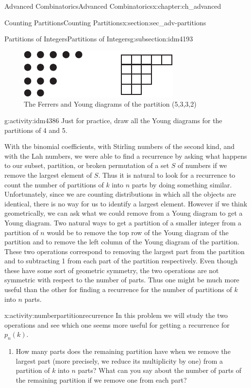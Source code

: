 \documentclass[oneside,10pt,]{book}
\numberwithin{equation}{chapter}
\begin{document}
\begin{chapterptx}{Advanced Combinatorics}{}{Advanced Combinatorics}{}{}{x:chapter:ch_advanced}
\begin{sectionptx}{Counting Partitions}{}{Counting Partitions}{}{}{x:section:sec_adv-partitions}
\begin{subsectionptx}{Partitions of Integers}{}{Partitions of Integers}{}{}{g:subsection:idm4193}
\begin{figure}
\centering
\includegraphics[width=0.45\linewidth]{images/FerrersYoung}
\caption{The Ferrers and Young diagrams of the partition (5,3,3,2)\label{x:figure:FerrersYoung}}
\end{figure}
\begin{activity}{}{g:activity:idm4386}%
Just for practice, draw all the Young diagrams for the partitions of 4 and 5.%
\end{activity}
With the binomial coefficients, with Stirling numbers of the second kind, and with the Lah numbers, we were able to find a recurrence by asking what happens to our subset, partition, or broken permutation of a set \(S\) of numbers if we remove the largest element of \(S\). Thus it is natural to look for a recurrence to count the number of partitions of \(k\) into \(n\) parts by doing something similar. Unfortunately, since we are counting distributions in which all the objects are identical, there is no way for us to identify a largest element. However if we think geometrically, we can ask what we could remove from a Young diagram to get a Young diagram. Two natural ways to get a partition of a smaller integer from a partition of \(n\) would be to remove the top row of the Young diagram of the partition and to remove the left column of the Young diagram of the partition. These two operations correspond to removing the largest part from the partition and to subtracting 1 from each part of the partition respectively. Even though these have some sort of geometric symmetry, the two operations are not symmetric with respect to the number of parts. Thus one might be much more useful than the other for finding a recurrence for the number of partitions of \(k\) into \(n\) parts.%
\begin{activity}{}{x:activity:numberpartitionrecurrence}%
In this problem we will study the two operations and see which one seems more useful for getting a recurrence for \(p_n(k)\).%
\begin{enumerate}[font=\bfseries,label=(\alph*),ref=\alph*]
\item{}How many parts does the remaining partition have when we remove the largest part (more precisely, we reduce its multiplicity by one) from a partition of \(k\) into \(n\) parts?  What can you say about the number of parts of the remaining partition if we remove one from each part?%

\end{enumerate}
\end{activity}
\end{subsectionptx}
\end{sectionptx}
\end{chapterptx}
\end{document}
